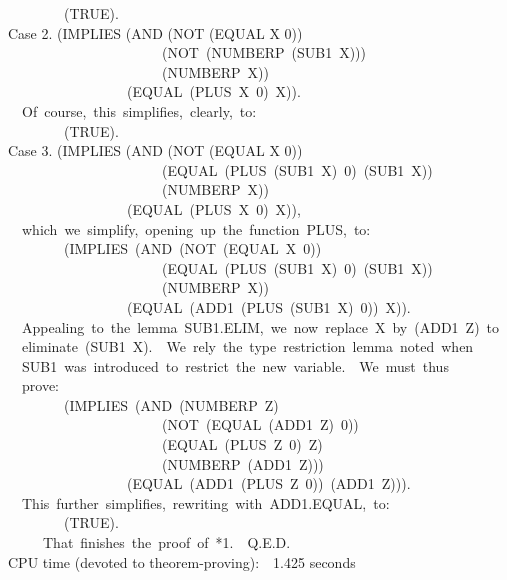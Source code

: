 \documentclass[10pt]{book}
\newenvironment{pubasis}{\begin{flushleft}}{\end{flushleft}}
\begin{document}
\begin{pubasis}
~~~~~~~~(TRUE).\\

Case 2.	(IMPLIES (AND (NOT (EQUAL X 0))\\
~~~~~~~~~~~~~~~~~~~~~~(NOT~(NUMBERP~(SUB1~X)))\\
~~~~~~~~~~~~~~~~~~~~~~(NUMBERP~X))\\
~~~~~~~~~~~~~~~~~(EQUAL~(PLUS~X~0)~X)).\\

~~Of~course,~this~simplifies,~clearly,~to:\\

~~~~~~~~(TRUE).\\

Case 3.	(IMPLIES (AND (NOT (EQUAL X 0))\\
~~~~~~~~~~~~~~~~~~~~~~(EQUAL~(PLUS~(SUB1~X)~0)~(SUB1~X))\\
~~~~~~~~~~~~~~~~~~~~~~(NUMBERP~X))\\
~~~~~~~~~~~~~~~~~(EQUAL~(PLUS~X~0)~X)),\\

~~which~we~simplify,~opening~up~the~function~PLUS,~to:\\

~~~~~~~~(IMPLIES~(AND~(NOT~(EQUAL~X~0))\\
~~~~~~~~~~~~~~~~~~~~~~(EQUAL~(PLUS~(SUB1~X)~0)~(SUB1~X))\\
~~~~~~~~~~~~~~~~~~~~~~(NUMBERP~X))\\
~~~~~~~~~~~~~~~~~(EQUAL~(ADD1~(PLUS~(SUB1~X)~0))~X)).\\

~~Appealing~to~the~lemma~SUB1.ELIM,~we~now~replace~X~by~(ADD1~Z)~to\\
~~eliminate~(SUB1~X).~~We~rely~the~type~restriction~lemma~noted~when\\
~~SUB1~was~introduced~to~restrict~the~new~variable.~~We~must~thus\\
~~prove:\\

~~~~~~~~(IMPLIES~(AND~(NUMBERP~Z)\\
~~~~~~~~~~~~~~~~~~~~~~(NOT~(EQUAL~(ADD1~Z)~0))\\
~~~~~~~~~~~~~~~~~~~~~~(EQUAL~(PLUS~Z~0)~Z)\\
~~~~~~~~~~~~~~~~~~~~~~(NUMBERP~(ADD1~Z)))\\
~~~~~~~~~~~~~~~~~(EQUAL~(ADD1~(PLUS~Z~0))~(ADD1~Z))).\\

~~This~further~simplifies,~rewriting~with~ADD1.EQUAL,~to:\\

~~~~~~~~(TRUE).\\

~~~~~That~finishes~the~proof~of~*1.~~Q.E.D.\\

CPU time (devoted to theorem-proving):~~1.425 seconds\\
\end{pubasis}
\end{document}
